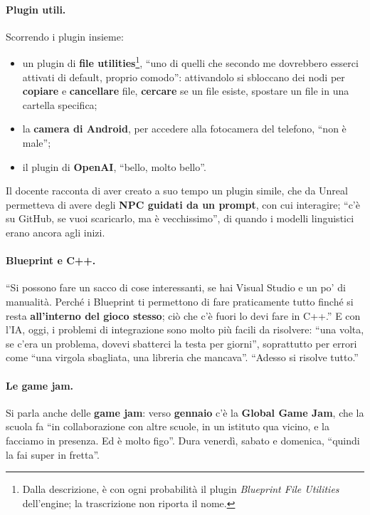 \paragraph{Plugin utili.} Scorrendo i plugin insieme:
\begin{itemize}
  \item un plugin di \textbf{file utilities}\footnote{Dalla descrizione, è con
        ogni probabilità il plugin \emph{Blueprint File Utilities}
        dell'engine; la trascrizione non riporta il nome.}, ``uno di quelli che
        secondo me dovrebbero esserci attivati di default, proprio comodo'':
        attivandolo si sbloccano dei nodi per \textbf{copiare} e
        \textbf{cancellare} file, \textbf{cercare} se un file esiste, spostare
        un file in una cartella specifica;
  \item la \textbf{camera di Android}, per accedere alla fotocamera del
        telefono, ``non è male'';
  \item il plugin di \textbf{OpenAI}, ``bello, molto bello''.
\end{itemize}
Il docente racconta di aver creato a suo tempo un plugin simile, che da Unreal
permetteva di avere degli \textbf{NPC guidati da un prompt}, con cui interagire;
``c'è su GitHub, se vuoi scaricarlo, ma è vecchissimo'', di quando i modelli
linguistici erano ancora agli inizi.

\paragraph{Blueprint e C++.} ``Si possono fare un sacco di cose interessanti, se
hai Visual Studio e un po' di manualità. Perché i Blueprint ti permettono di fare
praticamente tutto finché si resta \textbf{all'interno del gioco stesso}; ciò che
c'è fuori lo devi fare in C++.'' E con l'IA, oggi, i problemi di integrazione
sono molto più facili da risolvere: ``una volta, se c'era un problema, dovevi
sbatterci la testa per giorni'', soprattutto per errori come ``una virgola
sbagliata, una libreria che mancava''. ``Adesso si risolve tutto.''

\paragraph{Le game jam.} Si parla anche delle \textbf{game jam}: verso
\textbf{gennaio} c'è la \textbf{Global Game Jam}, che la scuola fa ``in
collaborazione con altre scuole, in un istituto qua vicino, e la facciamo in
presenza. Ed è molto figo''. Dura venerdì, sabato e domenica, ``quindi la fai
super in fretta''.

